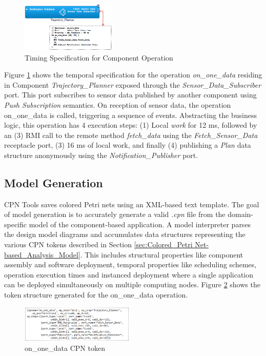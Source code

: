 \begin{figure}[htb]
	\centering
	\includegraphics[width=0.40\textwidth]{figs/Timing_Specification.png}
	\caption{Timing Specification for Component Operation}
	\label{fig:ANTLR}
\end{figure}

Figure \ref{fig:ANTLR} shows the %
temporal specification for the operation \emph{on\_one\_data} residing in Component \emph{Trajectory\_Planner} exposed through the \emph{Sensor\_Data\_Subscriber} port. This port subscribes to sensor data published by another component using \emph{Push Subscription} semantics. On reception of sensor data, the operation on\_one\_data is called, triggering a sequence of events. Abstracting the business logic, this operation has 4 execution steps: (1) Local \emph{work} for  12 ms, followed by an (3) RMI call to the remote method \emph{fetch\_data} using the \emph{Fetch\_Sensor\_Data} receptacle port, (3) 16 ms of local work, and finally (4) publishing a \emph{Plan} data structure anonymously using the \emph{Notification\_Publisher} port.   

\subsection{Model Generation}

CPN Tools saves colored Petri nets using an XML-based text template. The goal of model generation is to accurately generate a valid \emph{.cpn} file from the domain-specific model of the component-based application. A model interpreter parses the design model diagrams and accumulates data structures representing the various CPN tokens described in Section \ref{sec:Colored_Petri Net-based_Analysis_Model}. This includes structural properties like component assembly and software deployment, temporal properties like scheduling schemes, operation execution times and instanced deployment where a single application can be deployed simultaneously on multiple computing nodes. Figure \ref{fig:GT} shows the token structure generated for the on\_one\_data operation.

\begin{figure}[htb]
	\centering
	\includegraphics[width=0.48\textwidth]{figs/Generated_Token.png}
	\caption{on\_one\_data CPN token}
	\label{fig:GT}
\end{figure}


